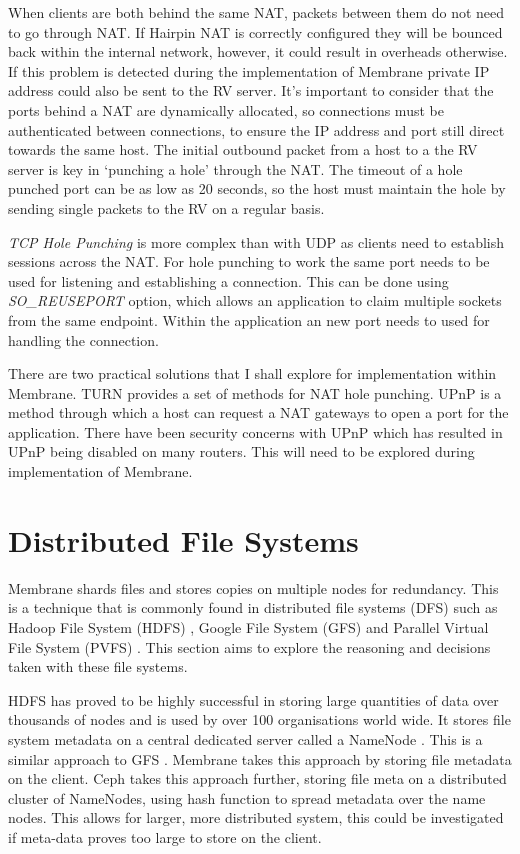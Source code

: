 \documentclass[11pt, a4paper, twocolumn, twoside]{report}
\begin{document}
When clients are both behind the same NAT, packets between them do not need to go through NAT. If Hairpin NAT is correctly configured they will be bounced back within the internal network, however, it could result in overheads otherwise. If this problem is detected during the implementation of Membrane private IP address could also be sent to the RV server. It's important to consider that the ports behind a NAT are dynamically allocated, so connections must be authenticated between connections, to ensure the IP address and port still direct towards the same host. The initial outbound packet from a host to a the RV server is key in `punching a hole' through the NAT. The timeout of a hole punched port can be as low as 20 seconds, so the host must maintain the hole by sending single packets to the RV on a regular basis.

\emph{TCP Hole Punching} is more complex than with UDP as clients need to establish sessions across the NAT. For hole punching to work the same port needs to be used for listening and establishing a connection. This can be done using \emph{SO\_REUSEPORT} option, which allows an application to claim multiple sockets from the same endpoint. Within the application an new port needs to used for handling the connection.

There are two practical solutions that I shall explore for implementation within Membrane. TURN \citep{wing2010traversal} provides a set of methods for NAT hole punching. UPnP \citep{boucadair2013universal} is a method through which a host can request a NAT gateways to open a port for the application. There have been security concerns with UPnP which has resulted in UPnP being disabled on many routers. This will need to be explored during implementation of Membrane.

\section{Distributed File Systems}

Membrane shards files and stores copies on multiple nodes for redundancy. This is a technique that is commonly found in distributed file systems (DFS) such as Hadoop File System (HDFS) \citep{hdfsAnalysis}, Google File System (GFS) \citep{TheGFS} and Parallel Virtual File System (PVFS) \citep{ross2000pvfs}. This section aims to explore the reasoning and decisions taken with these file systems.

HDFS has proved to be highly successful in storing large quantities of data over thousands of nodes and is used by over 100 organisations world wide. It stores file system metadata on a central dedicated server called a NameNode \citep{hdfsAnalysis}. This is a similar approach to GFS \citep{mckusick2010gfs}. Membrane takes this approach by storing file metadata on the client. Ceph takes this approach further, storing file meta on a distributed cluster of NameNodes, using hash function to spread metadata over the name nodes. \citep{weil2006ceph} This allows for larger, more distributed system, this could be investigated if meta-data proves too large to store on the client.
\end{document}

